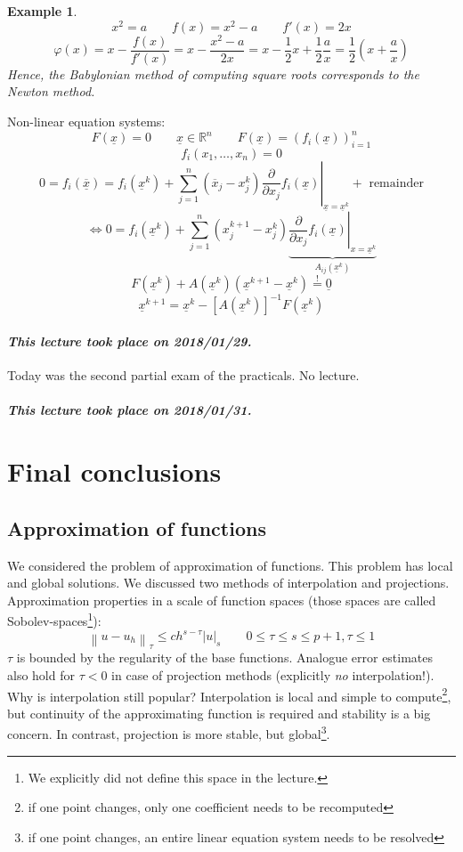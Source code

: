 \documentclass{article}
\newtheorem{example}{Example}
\newcommand{\abs}[1]{\left|#1\right|}
\newcommand{\norm}[1]{\left\|#1\right\|}
\newcommand{\dateref}[1]{\paragraph{\textit{This lecture took place on #1.}}}
\begin{document}
\begin{example}
  \[ x^2 = a \qquad f(x) = x^2 - a \qquad f'(x) = 2x \]
  \[ \varphi(x) = x - \frac{f(x)}{f'(x)} = x - \frac{x^2 - a}{2x} = x - \frac12 x + \frac12 \frac{a}{x} = \frac12\left(x + \frac ax\right) \]
  Hence, the Babylonian method of computing square roots corresponds to the Newton method.
\end{example}

Non-linear equation systems:
\[ F(\underline x) = 0 \qquad \underline x \in \mathbb R^n \qquad F(\underline x) = \left(f_i(\underline x)\right)^n_{i=1} \]
\[ f_i(x_1, \ldots, x_n) = 0 \]
\[ 0 = f_i(\overline{\underline{x}}) = \left.f_i(\underline x^k) + \sum_{j=1}^n \left(\overline x_j - x_j^k\right) \frac{\partial}{\partial x_j} f_i(\underline x)\right|_{\underline x = \underline x^k} + \text{ remainder} \]
\[ \iff 0 = f_i(\underline x^k) + \sum_{j=1}^n \left(x_j^{k+1} - x_j^k\right) \underbrace{\left.\frac{\partial}{\partial x_j} f_i(\underline x)\right|_{x = \underline x^k}}_{A_{ij}(\underline x^k)} \]
\[ F(\underline x^k) + A(\underline x^k) \left(\underline x^{k+1} - \underline x^k\right) \stackrel!= \underline 0 \]
\[ \underline x^{k+1} = \underline x^k - \left[A(\underline x^k)\right]^{-1} F(\underline x^k) \]

\dateref{2018/01/29}

Today was the second partial exam of the practicals. No lecture.

\dateref{2018/01/31}

\section{Final conclusions}

\subsection{Approximation of functions}

We considered the problem of approximation of functions.
This problem has local and global solutions. We discussed two methods of interpolation and projections.
Approximation properties in a scale of function spaces (those spaces are called Sobolev-spaces\footnote{We explicitly did not define this space in the lecture.}):
\[ \norm{u - u_h}_{\tau} \leq ch^{s-\tau} \abs{u}_s \qquad 0 \leq \tau \leq s \leq p+1, \tau \leq 1 \]
$\tau$ is bounded by the regularity of the base functions.
Analogue error estimates also hold for $\tau < 0$ in case of projection methods (explicitly \emph{no} interpolation!).
Why is interpolation still popular? Interpolation is local and simple to compute\footnote{if one point changes, only one coefficient needs to be recomputed}, but continuity of the approximating function is required and stability is a big concern.
In contrast, projection is more stable, but global\footnote{if one point changes, an entire linear equation system needs to be resolved}.
\end{document}

